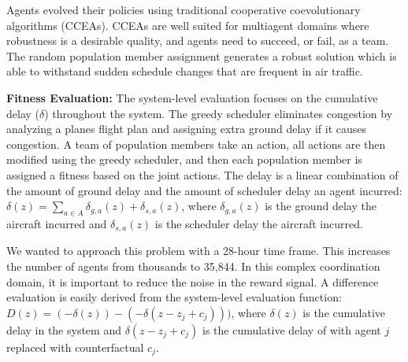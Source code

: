 \documentclass{sig-alternate}
\begin{document}
Agents evolved their policies using traditional cooperative coevolutionary algorithms (CCEAs). CCEAs are well suited for multiagent domains where robustness is a desirable quality, and agents need to succeed, or fail, as a team. The random population member assignment generates a robust solution which is able to withstand sudden schedule changes that are frequent in air traffic.


\textbf{Fitness Evaluation:} The system-level evaluation focuses on the cumulative delay ($\delta$) throughout the system.
The greedy scheduler eliminates congestion by analyzing a planes flight plan and assigning extra ground delay if it causes congestion. A team of population members take an action, all actions are then modified using the greedy scheduler, and then each population member is assigned a fitness based on the joint actions. The delay is a linear combination of the amount of ground delay and the amount of scheduler delay an agent incurred: $\delta(z) = \sum_{a \in A} \delta_{g,a}(z) + \delta_{s,a}(z)$, where $\delta_{g,a}(z)$ is the ground delay the aircraft incurred and $\delta_{s,a}(z)$ is the scheduler delay the aircraft incurred. 

We wanted to approach this problem with a 28-hour time frame. This increases the number of agents from thousands to 35,844. In this complex coordination domain, it is important to reduce the noise in the reward signal. A difference evaluation is easily derived from the system-level evaluation function: $D(z) = (-\delta(z)) - (-\delta(z-z_j + c_j)))$, where \textit{$\delta(z)$} is the cumulative delay in the system and \textit{$\delta(z-z_j + c_j)$} is the cumulative delay of with agent $j$ replaced with counterfactual \textit{$c_j$}.
\end{document}
